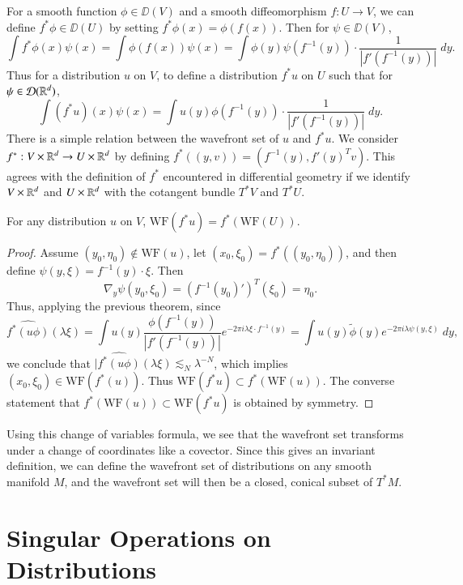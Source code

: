 For a smooth function $\phi \in \DD(V)$ and a smooth diffeomorphism $f: U \to V$, we can define $f^* \phi \in \DD(U)$ by setting $f^* \phi(x) = \phi(f(x))$. Then for $\psi \in \DD(V)$,
%
\[ \int f^* \phi(x) \psi(x) = \int \phi(f(x)) \psi(x) = \int \phi(y) \psi(f^{-1}(y)) \cdot \frac{1}{|f'(f^{-1}(y))|} \; dy. \]
%
Thus for a distribution $u$ on $V$, to define a distribution $f^* u$ on $U$ such that for $\psi \in \operatorname{\mathcal{D}}(\operatorname{\mathbb{R}}^d)$,
%
\[ \int (f^* u)(x) \psi(x) = \int u(y) \phi(f^{-1}(y)) \cdot \frac{1}{|f'(f^{-1}(y))|}\; dy. \]
%
There is a simple relation between the wavefront set of $u$ and $f^* u$. We consider $f^*: V \times \operatorname{\mathbb{R}}^d \to U \times \operatorname{\mathbb{R}}^d$ by defining $f^*((y,v)) = (f^{-1}(y), f'(y)^T v)$. This agrees with the definition of $f^*$ encountered in differential geometry if we identify $V \times \operatorname{\mathbb{R}}^d$ and $U \times \operatorname{\mathbb{R}}^d$ with the cotangent bundle $T^* V$ and $T^* U$.

\begin{theorem}
    For any distribution $u$ on $V$, $\text{WF}(f^* u) = f^*(\text{WF}(U))$.
\end{theorem}
\begin{proof}
    Assume $(y_0,\eta_0) \not \in \text{WF}(u)$, let $(x_0,\xi_0) = f^*((y_0,\eta_0))$, and then define $\psi(y,\xi) = f^{-1}(y) \cdot \xi$. Then
    \[ \nabla_y \psi(y_0,\xi_0) = (f^{-1}(y_0)')^T(\xi_0) = \eta_0. \]
    Thus, applying the previous theorem, since
    \[ \widehat{f^*(u \phi)}(\lambda \xi) = \int u(y) \frac{\phi(f^{-1}(y))}{|f'(f^{-1}(y))|} e^{-2 \pi i \lambda \xi \cdot f^{-1}(y)} = \int u(y) \tilde{\phi}(y) e^{-2 \pi i \lambda \psi(y,\xi)}\; dy, \]
    we conclude that $|\widehat{f^*(u \phi)}(\lambda \xi) \lesssim_N \lambda^{-N}$, which implies $(x_0,\xi_0) \in \text{WF}(f^*(u))$. Thus $\text{WF}(f^* u) \subset f^*(\text{WF}(u))$. The converse statement that $f^*(\text{WF}(u)) \subset \text{WF}(f^* u)$ is obtained by symmetry.
\end{proof}

Using this change of variables formula, we see that the wavefront set transforms under a change of coordinates like a covector. Since this gives an invariant definition, we can define the wavefront set of distributions on any smooth manifold $M$, and the wavefront set will then be a closed, conical subset of $T^* M$.



\section{Singular Operations on Distributions}

